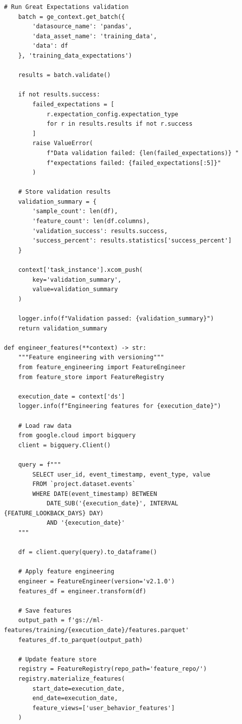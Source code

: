 \begin{lstlisting}[style=python, caption=Production ML Training Pipeline with Airflow]
    # Run Great Expectations validation
    batch = ge_context.get_batch({
        'datasource_name': 'pandas',
        'data_asset_name': 'training_data',
        'data': df
    }, 'training_data_expectations')

    results = batch.validate()

    if not results.success:
        failed_expectations = [
            r.expectation_config.expectation_type
            for r in results.results if not r.success
        ]
        raise ValueError(
            f"Data validation failed: {len(failed_expectations)} "
            f"expectations failed: {failed_expectations[:5]}"
        )

    # Store validation results
    validation_summary = {
        'sample_count': len(df),
        'feature_count': len(df.columns),
        'validation_success': results.success,
        'success_percent': results.statistics['success_percent']
    }

    context['task_instance'].xcom_push(
        key='validation_summary',
        value=validation_summary
    )

    logger.info(f"Validation passed: {validation_summary}")
    return validation_summary

def engineer_features(**context) -> str:
    """Feature engineering with versioning"""
    from feature_engineering import FeatureEngineer
    from feature_store import FeatureRegistry

    execution_date = context['ds']
    logger.info(f"Engineering features for {execution_date}")

    # Load raw data
    from google.cloud import bigquery
    client = bigquery.Client()

    query = f"""
        SELECT user_id, event_timestamp, event_type, value
        FROM `project.dataset.events`
        WHERE DATE(event_timestamp) BETWEEN
            DATE_SUB('{execution_date}', INTERVAL {FEATURE_LOOKBACK_DAYS} DAY)
            AND '{execution_date}'
    """

    df = client.query(query).to_dataframe()

    # Apply feature engineering
    engineer = FeatureEngineer(version='v2.1.0')
    features_df = engineer.transform(df)

    # Save features
    output_path = f'gs://ml-features/training/{execution_date}/features.parquet'
    features_df.to_parquet(output_path)

    # Update feature store
    registry = FeatureRegistry(repo_path='feature_repo/')
    registry.materialize_features(
        start_date=execution_date,
        end_date=execution_date,
        feature_views=['user_behavior_features']
    )


\end{lstlisting}
